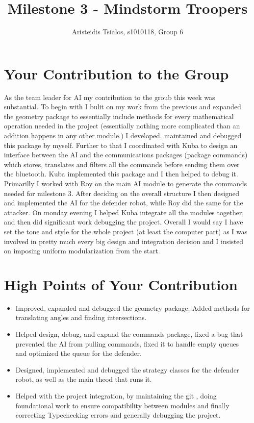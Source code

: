 \documentclass[dvips]{article}
\begin{document}
\sloppy
\title{Milestone 3 - Mindstorm Troopers}
 
\author{Aristeidis Tsialos, s1010118, Group 6}
 
\maketitle

\section{Your Contribution to the Group}
As the team leader for AI my contribution to the groub this week was substantial. To begin with I bulit on my work from the previous and expanded the geometry package to essentially include methods for every mathematical operation needed in the project (essentially nothing more complicated than an addition happens in any other module.) I developed, maintained and debugged this package by myself. Further to that I coordinated with Kuba to design an interface between the AI and the communications packages (package commands) which stores, translates and filters all the commands before sending them over the bluetooth. Kuba implemented this package and I then helped to debug it. Primarilly I worked with Roy on the main AI module to generate the commands needed for milestone 3. After deciding on the overall structure I then designed and implemented the AI for the defender robot, while Roy did the same for the attacker. On monday evening I helped Kuba integrate all the modules together, and then did significant work debugging the project. Overall I would say I have set the tone and style for the whole project (at least the computer part) as I was involved in pretty much every big design and integration decision and I insisted on imposing uniform modularization from the start.

\section{High Points of Your Contribution}
\begin{itemize}
  \item Improved, expanded and debugged the geometry package: Added methods for translating angles and finding intersections.
  \item Helped design, debug, and expand the commands package, fixed a bug that prevented the AI from pulling commands, fixed it to handle empty 		queues and optimized the queue for the defender.
  \item Designed, implemented and debugged the strategy classes for the defender robot, as well as the main theod that runs it.
  \item Helped with the project integration, by maintaining the git , doing foundational work to ensure compatibility between modules and finally 		correcting Typechecking errors and generally debugging the project.
\end{itemize} 
\end{document}
